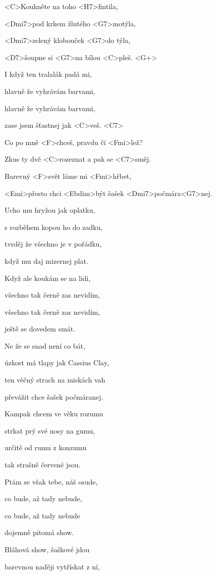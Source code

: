 

\zs
<C>Koukněte na toho <H7>fintila,

<Dmi7>pod krkem žlutého <G7>motýla,

<Dmi7>zelený klobouček <G7>do týla,

<D7>šoupne si <G7>na bílou <C>pleš. <G+>
\ks

\zs
I když ten tralalák padá mi,

hlavně že vyhrávám barvami,

hlavně že vyhrávám barvami,

zase jsem šťastnej jak <C>veš. <C7>
\ks

\zr
Co po mně <F>chceš, pravdu či <Fmi>lež?

Zkus ty dvě <C>rozeznat a pak se <C7>směj.

Barevný <F>svět láme mi <Fmi>hřbet,

<Emi>přesto chci <Ebdim>být šašek <Dmi7>počmára<G7>nej.
\kr

\zs
Ucho mu hryžou jak oplatku,

s rozběhem kopou ho do zadku,

tvrděj že všechno je v pořádku,

když mu daj mizernej plat.
\ks

\zs
Když ale koukám se na lidi,

všechno tak černě zas nevidím,

všechno tak černě zas nevidím,

ještě se dovedem smát.
\ks

\zr
Ne že se snad není co bát,

úzkost má tlapy jak Cassius Clay,

ten věčný strach na miskách vah

převážit chce šašek počmáranej.
\kr

\zs
Kampak chcem ve věku rozumu

strkat prý své nosy na gumu,

určitě od rumu z konzumu

tak strašně červené jsou.
\ks

\zs
Ptám se však tebe, náš osude,

co bude, až tady nebude,

co bude, až tady nebude

dojemně pitomá show.
\ks

\zr
Bláhová show, šaškové jdou

barevnou naději vytřískat z ní,

